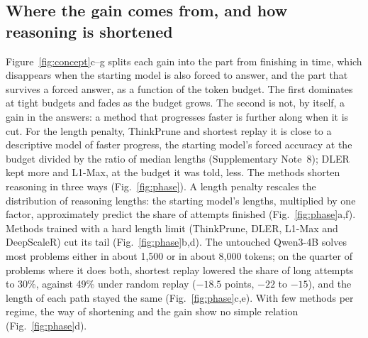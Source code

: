 \documentclass[10pt]{article}
\begin{document}
\subsection{Where the gain comes from, and how reasoning is shortened}
Figure~\ref{fig:concept}c--g splits each gain into the part from finishing in time, which disappears when the starting model is also forced to answer, and the part that survives a forced answer, as a function of the token budget. The first dominates at tight budgets and fades as the budget grows. The second is not, by itself, a gain in the answers: a method that progresses faster is further along when it is cut. For the length penalty, ThinkPrune and shortest replay it is close to a descriptive model of faster progress, the starting model's forced accuracy at the budget divided by the ratio of median lengths (Supplementary Note~8); DLER kept more and L1-Max, at the budget it was told, less. The methods shorten reasoning in three ways (Fig.~\ref{fig:phase}). A length penalty rescales the distribution of reasoning lengths: the starting model's lengths, multiplied by one factor, approximately predict the share of attempts finished (Fig.~\ref{fig:phase}a,f). Methods trained with a hard length limit (ThinkPrune, DLER, L1-Max and DeepScaleR) cut its tail (Fig.~\ref{fig:phase}b,d). The untouched Qwen3-4B solves most problems either in about 1{,}500 or in about 8{,}000 tokens; on the quarter of problems where it does both, shortest replay lowered the share of long attempts to 30\%, against 49\% under random replay ($-18.5$ points, $-22$ to $-15$), and the length of each path stayed the same (Fig.~\ref{fig:phase}c,e). With few methods per regime, the way of shortening and the gain show no simple relation (Fig.~\ref{fig:phase}d).
\end{document}
